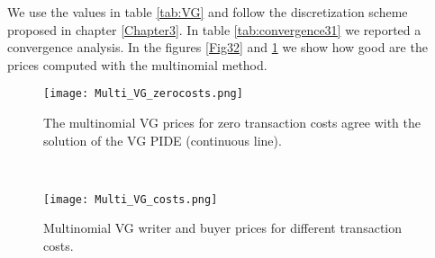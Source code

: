 We use the values in table \ref{tab:VG} and follow the discretization scheme proposed in chapter \ref{Chapter3}. 
In table \ref{tab:convergence31} we reported a convergence analysis.
In the figures \ref{Fig32} and \ref{Fig33} we show how good are the prices computed with the multinomial method. 
\begin{figure}[t!]
 \begin{minipage}[b]{0.5\linewidth}
   \centering
   \texttt{[image: Multi\_VG\_zerocosts.png]}
   \caption{The multinomial VG prices for zero transaction costs agree with the solution of the VG PIDE (continuous line).}
   \label{Fig32} 
 \end{minipage}
 \ \hspace{2mm} \hspace{3mm} \
 \begin{minipage}[b]{0.5\linewidth}
   \texttt{[image: Multi\_VG\_costs.png]}
   \caption{Multinomial VG writer and buyer prices for different transaction costs.}
   \label{Fig33}
 \end{minipage}
\end{figure}  

